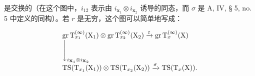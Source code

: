 是交换的（在这个图中，\(i_{12}\) 表示由 \(i_{\mathbf{x}_1} \otimes i_{\mathbf{x}_2}\) 诱导的同态，而 \(\sigma\) 是 A, IV, § 5, no. 5 中定义的同构）。若 \(r\) 是无穷，这个图可以简单地写成：

\[
\begin{array}{l} \operatorname{gr} \mathrm{T} _ {x _ {1}} ^ {(\infty)} (\mathrm{X} _ {1}) \otimes \operatorname{gr} \mathrm{T} _ {x _ {2}} ^ {(\infty)} (\mathrm{X} _ {2}) \xrightarrow {\varepsilon} \operatorname{gr} \mathrm{T} _ {x} ^ {(\infty)} (\mathrm{X}) \\ \Biggl \downarrow_ {i _ {\mathbf {X} _ {1}} \otimes i _ {\mathbf {X} _ {2}}} \\ \operatorname{TS} (\mathrm{T} _ {x _ {1}} (\mathrm{X} _ {1})) \otimes \operatorname{TS} (\mathrm{T} _ {x _ {2}} (\mathrm{X} _ {2})) \xrightarrow {\sigma} \operatorname{TS} (\mathrm{T} _ {x} (\mathrm{X})). \end{array}
\]


